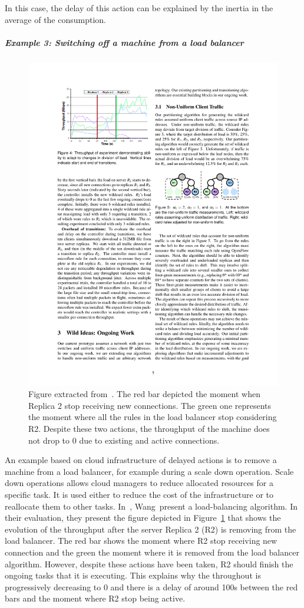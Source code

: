 In this case, the delay of this action can be explained by the inertia in the average of the consumption.

\subparagraph{Example 3: Switching off a machine from a load balancer}
\begin{figure}
	\centering
	\includegraphics[width=0.5\linewidth]{img/chapt-tkm/intro/load-balencer}
	\caption{Figure extracted from~\cite{DBLP:conf/nsdi/WangBR11}. The red bar depicted the moment when Replica 2 stop receiving new connections. The green one represents the moment where all the rules in the load balancer stop considering R2. Despite these two actions, the throughput of the machine does not drop to 0 due to existing and active connections.}
	\label{fig:tkm:intro:example-load-balencer}
	
\end{figure}


An example based on cloud infrastructure of delayed actions is to remove a machine from a load balancer, for example during a scale down operation.
Scale down operations allows cloud managers to reduce allocated resources for a specific task.
It is used either to reduce the cost of the infrastructure or to reallocate them to other tasks.
In~\cite{DBLP:conf/nsdi/WangBR11}, Wang~\etal present a load-balancing algorithm.
In their evaluation, they present the figure depicted in Figure~\ref{fig:tkm:intro:example-load-balencer} that shows the evolution of the throughput after the server Replica 2 (R2) is removing from the load balancer.
The red bar shows the moment where R2 stop receiving new connection and the green the moment where it is removed from the load balancer algorithm.
However, despite these actions have been taken, R2 should finish the ongoing tasks that it is executing.
This explains why the throughout is progressively decreasing to 0 and there is a delay of around 100s between the red bars and the moment where R2 stop being active.

